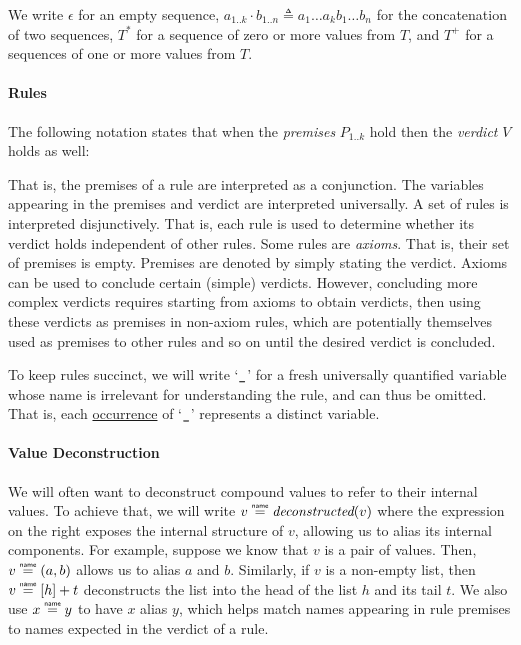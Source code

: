 We write $\epsilon$ for an empty sequence,
$a_{1..k} \cdot b_{1..n} \triangleq a_1\ldots a_k b_1 \ldots b_n$ for the concatenation of two sequences,
$T^*$ for a sequence of zero or more values from $T$, and $T^+$ for a sequences of one or more values from $T$.

\paragraph{Rules}
The following notation states that when the \emph{premises} $P_{1..k}$ hold then the \emph{verdict} $V$ holds as well:
\begin{mathpar}
\end{mathpar}
That is, the premises of a rule are interpreted as a conjunction.
The variables appearing in the premises and verdict are interpreted universally.
%
A set of rules is interpreted disjunctively. That is, each rule is used to determine whether its verdict
holds independent of other rules.
%
Some rules are \emph{axioms}. That is, their set of premises is empty. Premises are denoted by simply
stating the verdict.
%
Axioms can be used to conclude certain (simple) verdicts.
However, concluding more complex verdicts requires
starting from axioms to obtain verdicts, then using these verdicts as premises in non-axiom rules,
which are potentially themselves used as premises to other rules and so on until the desired verdict
is concluded.

To keep rules succinct, we will write `$\Ignore$' for a fresh universally quantified variable whose name is
irrelevant for understanding the rule, and can thus be omitted. That is, each \underline{occurrence}
of `$\Ignore$' represents a distinct variable.

\paragraph{Value Deconstruction}
We will often want to deconstruct compound values to refer to their internal values.
To achieve that, we will write $v \eqname \textit{deconstructed}(v)$ where the expression on the right
exposes the internal structure of $v$, allowing us to alias its internal components.
For example, suppose we know that $v$ is a pair of values.
Then, $v \eqname (a, b)$ allows us to alias $a$ and $b$.
Similarly, if $v$ is a non-empty list, then $v \eqname [h] + t$ deconstructs the list into the
head of the list $h$ and its tail $t$.
%
We also use $x \eqname y$ to have $x$ alias $y$, which helps match names appearing in rule premises to
names expected in the verdict of a rule.
